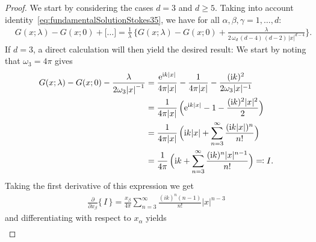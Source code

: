 \begin{proof}
  We start by considering the cases $d = 3$ and $d \geq 5$.
      Taking into account identity~\eqref{eq:fundamentalSolutionStokes35}, we have for all $\alpha, \beta, \gamma = 1,\dots,d$:
      \begin{align*}
        & G(x; \lambda) - G(x; 0) + \big[ \dots \big]
        = \frac{1}{\lambda}\, \bigg\{ G(x; \lambda) - G(x; 0) + \frac{\lambda}{2\, \omega_d \, (d - 4)\, (d - 2)\, |x|^{d - 4}} \bigg\}.
      \end{align*}
  If $d = 3$, a direct calculation will then yield the desired result:
  We start by noting that $\omega_3 = 4 \pi$ gives
  \begin{align*}
    G(x; \lambda) - G(x; 0) - \frac{\lambda}{2\omega_3 {|x|}^{-1}}
    &= \frac{\mathrm{e}^{\mathrm{i} k |x|}}{4\pi |x|} - \frac{1}{4 \pi |x|} - \frac{(\mathrm{i} k)^2}{2 \omega_3 |x|^{-1}} \\
    &= \frac{1}{4 \pi |x|} \, \Big( \mathrm{e}^{\mathrm{i} k |x|} - 1 - \frac{ (\mathrm{i} k)^2 |x|^2}{2} \Big)\\
    &= \frac{1}{4 \pi |x|} \, \Big( \mathrm{i} k |x| + \sum_{n = 3}^\infty \frac{(\mathrm{i} k |x| )^n}{n!} \Big) \\
    &= \frac{1}{4\pi} \, \Big( \mathrm{i} k + \sum_{n = 3}^\infty \frac{ (\mathrm{i} k )^n |x|^{n - 1}}{n!} \Big) \eqqcolon I.
  \end{align*}
  Taking the first derivative of this expression we get
  \begin{align*}
    \frac{\partial}{\partial x_\beta} \big\{ \, I \, \big\} = 
    \frac{x_\beta}{4 \pi} \sum_{n = 3}^\infty \frac{(ik)^n (n - 1) }{n!} |x|^{n - 3}
  \end{align*}
  and differentiating with respect to $x_\alpha$ yields
  \begin{align*}

\end{align*}
\end{proof}
